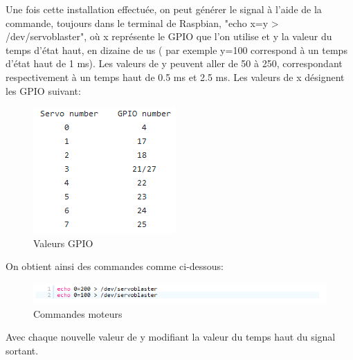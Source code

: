 \documentclass[a4paper,11pt]{report}
\begin{document}
				Une fois cette installation effectuée, on peut générer le signal à l'aide de la commande, toujours dans le terminal de Raspbian, "echo x=y > /dev/servoblaster", où x représente le GPIO que l'on utilise et y la valeur du temps d'état haut, en dizaine de us ( par exemple y=100 correspond à un temps d'état haut de 1 ms). Les valeurs de y peuvent aller de 50 à 250, correspondant respectivement à un temps haut de 0.5 ms et 2.5 ms. \newpage Les valeurs de x désignent les GPIO suivant:
					\begin{figure}[!h]
				  \begin{center}
				  	\includegraphics[scale=1]{Photos/gpio}
						\caption{Valeurs GPIO}
				  \end{center}
		  	\end{figure}
				
				On obtient ainsi des commandes comme ci-dessous:
				
					\begin{figure}[!h]
				  \begin{center}
				  	\includegraphics[scale=1]{Photos/sb}
						\caption{Commandes moteurs}
				  \end{center}
		  	\end{figure}
			
			Avec chaque nouvelle valeur de y modifiant la valeur du temps haut du signal sortant. \newline
			
\end{document}
